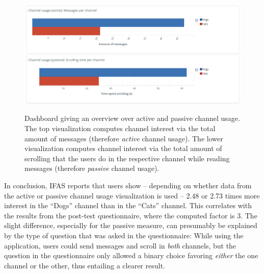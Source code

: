\begin{figure}[h]
        \caption{
        Dashboard giving an overview over active and passive channel usage.
        The top visualization computes channel interest via the total amount of messages (therefore \emph{active} channel usage).
        The lower visualization computes channel interest via the total amount of scrolling that the users do in the respective channel while reading messages (therefore \emph{passive} channel usage).
        }
        \includegraphics[width=1.1\textwidth]{gfx/dashboard-usage.png}
        \label{figure:evaluation:user:dashboard-channels}
\end{figure}

In conclusion, \ac{IFAS} reports that users show -- depending on whether data from the active or passive channel usage visualization is used -- 2.48 or 2.73 times more interest in the ``Dogs'' channel than in the ``Cats'' channel.
This correlates with the results from the post-test questionnaire, where the computed factor is 3.
The slight difference, especially for the passive measure, can presumably be explained by the type of question that was asked in the questionnaire:
While using the application, users could send messages and scroll in \emph{both} channels, but the question in the questionnaire only allowed a binary choice favoring \emph{either} the one channel or the other, thus entailing a clearer result.


